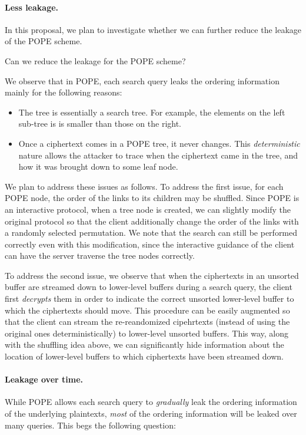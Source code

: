 \paragraph{Less leakage.}
In this proposal, we plan to investigate whether we can further reduce the
leakage of the POPE scheme. 

\begin{question}
Can we reduce the leakage for the POPE scheme?
\end{question}

We observe that in POPE, each search query leaks the ordering information
mainly for the following reasons: 

\begin{itemize}
\item The tree is essentially a search tree. For example, the elements on the
  left sub-tree is is smaller than those on the right.
 
\item Once a ciphertext comes in a POPE tree, it never changes. This {\em
  deterministic} nature allows the attacker to trace when the ciphertext came
  in the tree, and how it was brought down to some leaf node.  
\end{itemize}

We plan to address these issues as follows. To address the first issue, for
each POPE node, the order of the links to its children may be shuffled. Since
POPE is an interactive protocol, when a tree node is created, we can slightly
modify the original protocol so that the client additionally change the order
of the links with a randomly selected permutation. 
%
We note that the search can still be performed correctly even with this
modification, since the interactive guidance of the client can have the server
traverse the tree nodes correctly. 
    
To address the second issue, we observe that when the ciphertexts in an
unsorted buffer are streamed down to lower-level buffers during a search query,
the client first {\em decrypts} them in order to indicate the correct unsorted
lower-level buffer to which the ciphertexts should move. This procedure can be
easily augmented so that the client can stream the {re-reandomized cipehrtexts}
(instead of using the original ones deterministically) to lower-level unsorted
buffers. This way, along with the shuffling idea above, we can significantly
hide information about the location of lower-level buffers to which ciphertexts
have been streamed down. 

\paragraph{Leakage over time.}
While POPE allows each search query to {\it gradually} leak the ordering
information of the underlying plaintexts, {\em most} of the ordering
information will be leaked over many queries. This begs the following question: 

